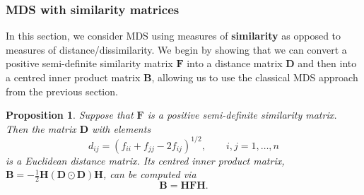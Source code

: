 \documentclass[
]{book}
\newtheorem{proposition}{Proposition}[chapter]
\theoremstyle{definition}
\theoremstyle{definition}
\theoremstyle{definition}
\theoremstyle{definition}
\theoremstyle{remark}
\begin{document}
\subsubsection*{MDS with similarity matrices}\label{mds-with-similarity-matrices}

In this section, we consider MDS using measures of \textbf{similarity} as opposed to measures of distance/dissimilarity. We begin by showing that we can convert a positive semi-definite similarity matrix \(\mathbf F\) into a distance matrix \(\mathbf D\) and then into a centred inner product matrix \(\mathbf B\), allowing us to use the classical MDS approach from the previous section.

\begin{proposition}
\protect\hypertarget{prp:mds2}{}\label{prp:mds2}Suppose that \(\mathbf F\) is a positive semi-definite similarity matrix. Then the matrix \(\mathbf D\) with elements
\begin{equation}
d_{ij}=\left ( f_{ii}+f_{jj} -2f_{ij} \right )^{1/2}, \qquad i,j=1, \ldots , n
\label{eq:defD}
\end{equation}
is a Euclidean distance matrix. Its centred inner product matrix, \(\mathbf B= -\frac{1}{2}\mathbf H(\mathbf D\odot\mathbf D)\mathbf H\), can be computed via
\begin{equation}
\mathbf B=\mathbf H\mathbf F\mathbf H.
\label{eq:BHFH}
\end{equation}
\end{proposition}
\end{document}
